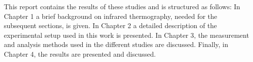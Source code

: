 	This report contains the results of these studies and is structured as follows: In Chapter 1 a brief background on infrared thermography, needed for the subsequent sections, is given. In Chapter 2 a detailed description of the experimental setup used in this work is presented. In Chapter 3, the measurement and analysis methods used in the different studies are discussed. Finally, in Chapter 4, the results are presented and discussed. 